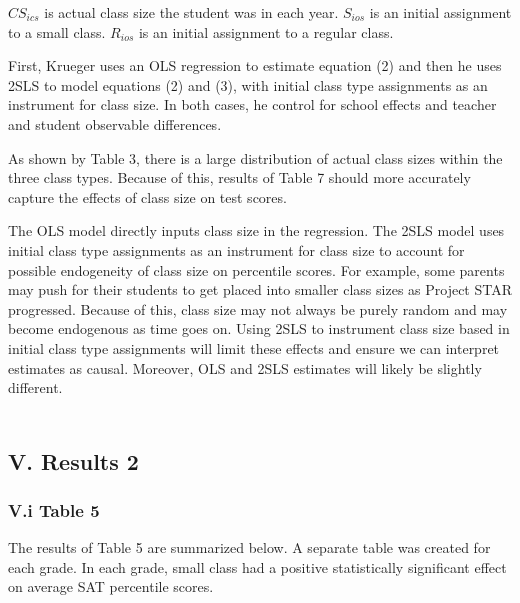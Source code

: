 \documentclass[a4paper,11pt]{article}
\begin{document}
$CS_{ics}$ is actual class size the student was in each year. $S_{ios}$ is an initial assignment to a small class. $R_{ios}$ is an initial assignment to a regular class.  \par

First, Krueger uses an OLS regression to estimate equation (2) and then he uses 2SLS to model equations (2) and (3), with initial class type assignments as an instrument for class size. In both cases, he control for school effects and teacher and student observable differences. \par 

As shown by Table 3, there is a large distribution of actual class sizes within the three class types. Because of this, results of Table 7 should more accurately capture the effects of class size on test scores. \par
The OLS model directly inputs class size in the regression. The 2SLS model uses initial class type assignments as an instrument for class size to account for possible endogeneity of class size on percentile scores. For example, some parents may push for their students to get placed into smaller class sizes as Project STAR progressed. Because of this, class size may not always be purely random and may become endogenous as time goes on. Using 2SLS to instrument class size based in initial class type assignments will limit these effects and ensure we can interpret estimates as causal. Moreover, OLS and 2SLS estimates will likely be slightly different. \\ \\  	

\subsection*{V. Results 2}

\subsubsection*{V.i Table 5}
The results of Table 5 are summarized below. A separate table was created for each grade. In each grade, small class had a positive statistically significant effect on average SAT percentile scores.\par
\end{document}
